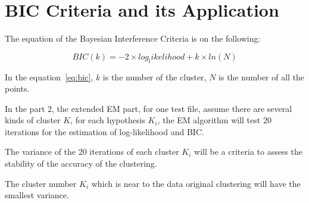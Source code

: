 \documentclass[11pt, a4paper]{article}
\begin{document}
\newpage
\section{BIC Criteria and its Application}

The equation of the Bayesian Interference Criteria is on the following:

\begin{equation}
BIC(k) = -2\times log_likelihood + k\times ln(N)
\label{eq:bic}
\end{equation}

In the equation~\ref*{eq:bic}, $k$ is the number of the cluster, $N$ is the number of all the points.


In the part 2, the extended EM part, for one test file, assume there are several kinds of cluster $K$, for each hypothesis $K_i$, the EM algorithm will test 20 iterations for the estimation of log-likelihood and BIC.

The variance of the 20 iterations of each cluster $K_i$ will be a criteria to assess the stability of the accuracy of the clustering.

The cluster number $K_i$ which is near to the data original clustering will have the smallest variance.   











  
% 





\end{document}
